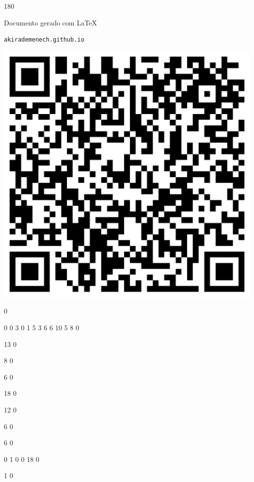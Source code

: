 \documentclass[12pt]{article}
\begin{document}
	\begin{turn}{180}	
		\begin{minipage}{\textwidth}		  
		  Documento gerado com \LaTeX			
		  
		  \texttt{akirademenech.github.io}

		  \includegraphics[height=0.3\textheight]{2e-2.pdf}

		\end{minipage}	
	\end{turn}  
		  
		\vfill  
		  
{
	0	%

	0	%
	0	%
	3	%
	0	%
	1	%
	5	%
	3	%
	6	%
	6	%
	10	%
	5	%
	8	%
	0	%

	13	%
	0	%

	8	%
	0	%

	6	%
	0	%

	18	%
	0	%

	12	%
	0	%

	6	%
	0	%

	6	%
	0	%

	0	%
	1	%
	0	%
	0	%
	18	%
	0	%

	1	%
	0	%

}	  
		    	
\end{document}
